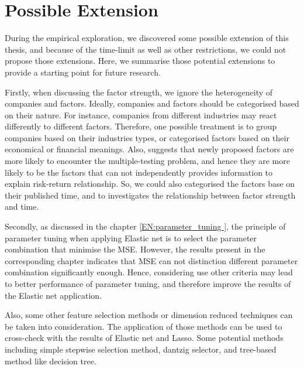 \section{Possible Extension}
During the empirical exploration, we discovered some possible extension of this thesis, and because of the time-limit as well as other restrictions, we could not propose those extensions.
Here, we summarise those potential extensions to provide a starting point for future research.

Firstly, when discussing the factor strength, we ignore the heterogeneity of companies and factors.
Ideally, companies and factors should be categorised based on their nature.
For instance, companies from different industries may react differently to different factors.
Therefore, one possible treatment is to group companies based on their industries types, or categorised factors based on their economical or financial meanings.
Also,  suggests that newly proposed factors are more likely to encounter the multiple-testing problem, and hence they are more likely to be the factors that can not independently provides information to explain risk-return relationship.
So, we could also categorised the factors base on their published time, and to investigates the relationship between factor strength and time.

Secondly, as discussed in the chapter \ref{EN:parameter_tuning }, the principle of parameter tuning when applying Elastic net is to select the parameter combination that minimise the MSE.
However, the results present in the corresponding chapter indicates that MSE can not distinction different parameter combination significantly enough.
Hence, considering use other criteria may lead to better performance of parameter tuning, and therefore improve the results of the Elastic net application.

Also, some other feature selection methods or dimension reduced techniques can be taken into consideration.
The application of those methods can be used to cross-check with the results of Elastic net and Lasso.
Some potential methods including simple stepwise selection method, dantzig selector, and tree-based method like decision tree.

